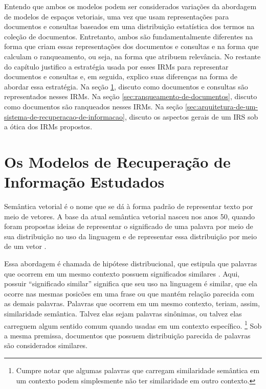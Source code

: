 \documentclass[
	12pt,				%
	openright,			%
	oneside,			%
	a4paper,			%
	english,			%
	french,				%
	spanish,			%
	brazil				%
	]{abntex2}
\begin{document}
Entendo que ambos os modelos podem ser considerados variações da abordagem de modelos de espaços vetoriais, uma vez que
usam representações para documentos e consultas baseados em uma distribuição estatística dos termos na coleção de documentos.
Entretanto, ambos são fundamentalmente diferentes na forma que criam essas representações dos documentos e consultas e na forma que calculam o ranqueamento, ou seja, na forma que atribuem relevância.
No restante do capítulo justifico a estratégia usada por esses IRMs para representar documentos e consultas e, em seguida, explico suas diferenças na forma de abordar essa estratégia.
Na seção \ref{sec:representacao-vetorial-de-texto}, discuto como documentos e consultas são representados nesses IRMs.
Na seção \ref{sec:ranqueamento-de-documentos}, discuto como documentos são ranqueados nesses IRMs.
Na seção \ref{sec:arquitetura-de-um-sistema-de-recuperacao-de-informacao}, discuto os aspectos gerais de um IRS sob a ótica dos IRMs propostos.

\section{Os Modelos de Recuperação de Informação Estudados}\label{sec:representacao-vetorial-de-texto}

Semântica vetorial é o nome que se dá à forma padrão de representar texto por meio de vetores.
A base da atual semântica vetorial nasceu nos anos 50, quando foram propostas ideias de representar
o significado de uma palavra por meio de sua distribuição no uso da linguagem e de representar essa distribuição por meio de um vetor
\cite{JurafskyMartin2023}.

Essa abordagem é chamada de hipótese distribucional, que estipula que palavras que ocorrem em um mesmo contexto possuem significados similares \cite{PilehvarCamacho-Collados2022}.
Aqui, possuir ``significado similar'' significa que seu uso na linguagem é similar, que ela ocorre nas mesmas posicões em uma frase ou que mantém relação parecida com as demais palavras.
Palavras que ocorrem em um mesmo contexto, teriam, assim, similaridade semântica.
Talvez elas sejam palavras sinônimas, ou talvez elas carreguem algum sentido comum quando usadas em um contexto específico.
\footnote{Cumpre notar que algumas palavras que carregam similaridade semântica em um contexto podem simplesmente não ter similaridade em outro contexto.}
Sob a mesma premissa, documentos que possuem distribuição parecida de palavras são considerados similares.
\end{document}
